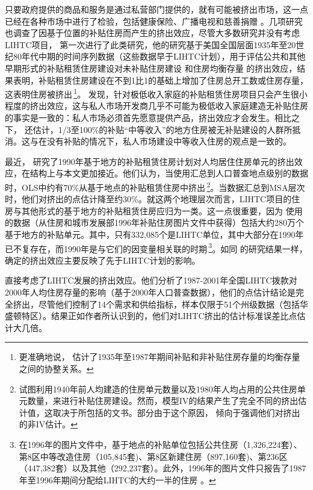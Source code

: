 \documentclass[lang=cn,11pt,a4paper]{paper}
\begin{document}
只要政府提供的商品和服务是通过私营部门提供的，就有可能被挤出市场，这一点已经在各种市场中进行了检验，包括健康保险、广播电视和慈善捐赠 \citep{Cutler1996391,Berry1999189,Andreoni2003792}。几项研究也调查了因基于位置的补贴住房而产生的挤出效应，尽管大多数研究并没有考虑LIHTC项目，\cite{Murray1983590,Murray1999107} 第一次进行了此类研究，他的研究基于美国全国层面1935年至20世纪80年代中期的时间序列数据（这些数据早于LIHTC计划），用于评估公共和其他早期形式的补贴租赁住房建设对未补贴住房建设 \citep{Murray1983590} 和住房均衡存量 \citep{Murray1999107} 的挤出效应，结果表明，补贴租赁住房建设在不到1比1的基础上增加了住房总开工数或住房存量，这表明住房被挤出\,\footnote{更准确地说，\cite{Murray1999107} 估计了1935年至1987年期间补贴和非补贴住房存量的均衡存量之间的协整关系。}。\cite{Murray1999107} 发现，针对极低收入家庭的补贴租赁住房项目只会产生很小程度的挤出效应，这与私人市场开发商几乎不可能为极低收入家庭建造无补贴住房的事实是一致的：私人市场必须首先愿意提供产品，挤出效应才会发生。相比之下，\cite{Murray1999107} 还估计，1/3至100\%的补贴“中等收入”的地方住房被无补贴建设的人群所抵消。这与在没有补贴的情况下，私人市场建设中等收入住房的观点是一致的。

最近，\cite{Sinai20052137} 研究了1990年基于地方的补贴租赁住房计划对人均居住住房单元的挤出效应，在结构上与本文更加接近。他们认为，当使用汇总到人口普查地点级别的数据时，OLS中约有70\%从基于地点的补贴租赁住房中挤出\,\footnote{\cite{Sinai20052137} 试图利用1940年前人均建造的住房单元数量以及1980年人均占用的公共住房单元数量，来进行补贴住房建设。然而，模型IV的结果产生了完全不同的挤出估计值，这取决于所包括的文书。部分由于这个原因，\cite{Sinai20052137} 倾向于强调他们对挤出的非IV估计。}。当数据汇总到MSA层次时，他们对挤出的点估计降至约30\%。就这两个地理层次而言，LIHTC项目的住房与其他形式的基于地方的补贴租赁住房应归为一类。这一点很重要，因为 \cite{Sinai20052137} 使用的数据（从住房和城市发展部1996年补贴住房图片文件中获得）包括大约280万个基于地方的补贴单元。其中，只有332,085个是LIHTC单位，其中大部分在1990年已不复存在，而1990年是与它们的因变量相关联的时期\,\footnote{在1996年的图片文件中，基于地点的补贴单位包括公共住房（1,326,224套）、第8区中等改造住房（105,845套)、第8区新建住房（897,160套)、第236区（447,382套）以及其他（292,237套）。此外，1996年的图片文件只报告了1987年至1996年期间分配给LIHTC的大约一半的住房 \citep{Malpezzi2002360}。}。如同 \cite{Murray1983590,Murray1999107} 的研究结果一样，\cite{Sinai20052137} 确定的挤出效应主要反映了先于LIHTC计划的影响。

\cite{Malpezzi2002360} 直接考虑了LIHTC发展的挤出效应。他们分析了1987-2001年全国LIHTC拨款对2000年人均住房存量的影响（基于2000年人口普查数据），他们的点估计结论是完全挤出，尽管他们控制了14个需求和供给指标，样本仅限于51个州级数据（包括华盛顿特区）。结果正如作者所认识到的，他们对LIHTC挤出的估计标准误差比点估计大几倍。
\end{document}

